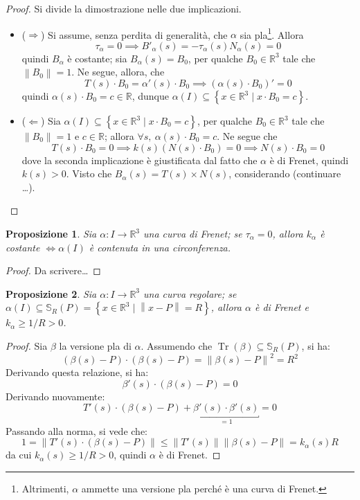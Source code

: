 \documentclass[12pt]{article}
\theoremstyle{style}
\newtheorem{prop}{Proposizione}[section]
\numberwithin{equation}{subsection}
\begin{document}
	\begin{proof}
		Si divide la dimostrazione nelle due implicazioni.
		\begin{itemize}
			\item ($\Rightarrow $) Si assume, senza perdita di generalit\`a, che $\alpha $ sia pla\footnote{Altrimenti, $\alpha $ ammette una versione pla perch\'e \`e una curva di Frenet.}.
				Allora 
				\[
				\tau _\alpha  = 0 \implies B'_\alpha (s) = - \tau _\alpha (s) N_\alpha (s) = 0 
				\] 
				quindi $B_\alpha $ \`e costante; sia $B_\alpha (s) = B_0$, per qualche $B_0\in \mathbb{R}^3$ tale che $\left\lVert B_0 \right\rVert =1$.
				Ne segue, allora, che
				\[
				T(s) \cdot B_0 = \alpha '(s) \cdot B_0\implies (\alpha (s) \cdot B_0)' = 0
				\] 
				quindi $\alpha (s)\cdot B_0 = c \in \mathbb{R}$, dunque $\alpha (I) \subseteq \left\{ x \in \mathbb{R}^3  \mid x\cdot B_0 = c \right\} $.
			\item ($\Leftarrow$) Sia $\alpha (I) \subseteq \left\{ x \in \mathbb{R}^3  \mid x\cdot B_0 =c  \right\} $, per qualche $B_0 \in \mathbb{R}^3$ tale che $\left\lVert B_0  \right\rVert  = 1$ e $c \in \mathbb{R}$; allora $\forall s, \ \alpha (s) \cdot B_0 = c$.
				Ne segue che
				\[
				T(s) \cdot B_0 = 0 \implies k(s) (N(s) \cdot B_0) = 0 \implies N(s) \cdot B_0 = 0
				\] 
				dove la seconda implicazione \`e giustificata dal fatto che $\alpha $ \`e di Frenet, quindi $k(s) > 0 $.
				Visto che $B_\alpha (s) = T(s) \times N(s)$, considerando (continuare \ldots).
		\end{itemize}
	\end{proof}
\begin{prop}
	Sia $\alpha : I \to \mathbb{R}^3$ una curva di Frenet; se $\tau _\alpha  = 0$, allora $k_\alpha $ \`e costante $\iff \alpha (I)$ \`e contenuta in una circonferenza.
\end{prop}
\begin{proof}
{\color{nred} Da scrivere\ldots}
\end{proof}
\begin{prop}
	Sia $\alpha : I \to \mathbb{R}^3$ una curva regolare; se $\alpha (I) \subseteq \mathbb{S}_R(P) = \left\{ x \in \mathbb{R}^3  \mid \left\lVert x - P \right\rVert = R \right\} $, allora $\alpha $ \`e di Frenet e $k_\alpha \ge 1 / R > 0$.
\end{prop}
\begin{proof}
	Sia $\beta $ la versione pla di $\alpha $. Assumendo che $\operatorname{Tr} (\beta ) \subseteq \mathbb{S}_R(P)$, si ha:
	\[
		(\beta (s) - P) \cdot (\beta (s) - P) = \left\lVert \beta (s) - P \right\rVert ^2 = R^2
	\] 
	Derivando questa relazione, si ha:
	\[
	\beta '(s) \cdot (\beta (s) - P) = 0
	\] 
	Derivando nuovamente:
	\[
		T'(s) \cdot (\beta (s)-P) + \underbracket{\beta '(s) \cdot \beta '(s)}_{=1}  = 0 
	\] 
	Passando alla norma, si vede che:
	\[
	1=\left\lVert T'(s) \cdot (\beta (s) - P) \right\rVert \le \left\lVert T'(s) \right\rVert \left\lVert \beta (s) - P \right\rVert = k_\alpha (s) R
\] 
	da cui $k_\alpha (s) \ge 1 / R > 0$, quindi $\alpha $ \`e di Frenet.
\end{proof}
\end{document}
